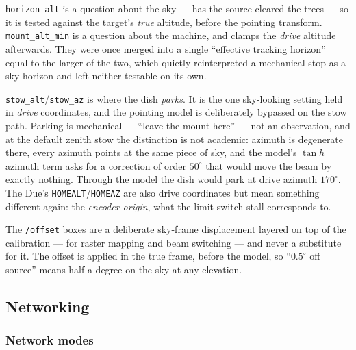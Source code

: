 \documentclass[11pt,a4paper]{article}
\begin{document}
\begin{description}[style=nextline]
    \item[Observing horizon versus mount limits] \texttt{horizon\_alt} is a question about the sky --- has the source cleared the trees --- so it is tested against the target's \emph{true} altitude, before the pointing transform. \texttt{mount\_alt\_min} is a question about the machine, and clamps the \emph{drive} altitude afterwards. They were once merged into a single ``effective tracking horizon'' equal to the larger of the two, which quietly reinterpreted a mechanical stop as a sky horizon and left neither testable on its own.
    \item[Stow versus the Due's home] \texttt{stow\_alt}/\texttt{stow\_az} is where the dish \emph{parks}. It is the one sky-looking setting held in \emph{drive} coordinates, and the pointing model is deliberately bypassed on the stow path. Parking is mechanical --- ``leave the mount here'' --- not an observation, and at the default zenith stow the distinction is not academic: azimuth is degenerate there, every azimuth points at the same piece of sky, and the model's $\tan h$ azimuth term asks for a correction of order $50^\circ$ that would move the beam by exactly nothing. Through the model the dish would park at drive azimuth $170^\circ$. The Due's \texttt{HOMEALT}/\texttt{HOMEAZ} are also drive coordinates but mean something different again: the \emph{encoder origin}, what the limit-switch stall corresponds to.
    \item[Operator offset versus calibration] The \texttt{/offset} boxes are a deliberate sky-frame displacement layered on top of the calibration --- for raster mapping and beam switching --- and never a substitute for it. The offset is applied in the true frame, before the model, so ``$0.5^\circ$ off source'' means half a degree on the sky at any elevation.
\end{description}

\subsection{Networking}

\subsubsection{Network modes}
\end{document}
